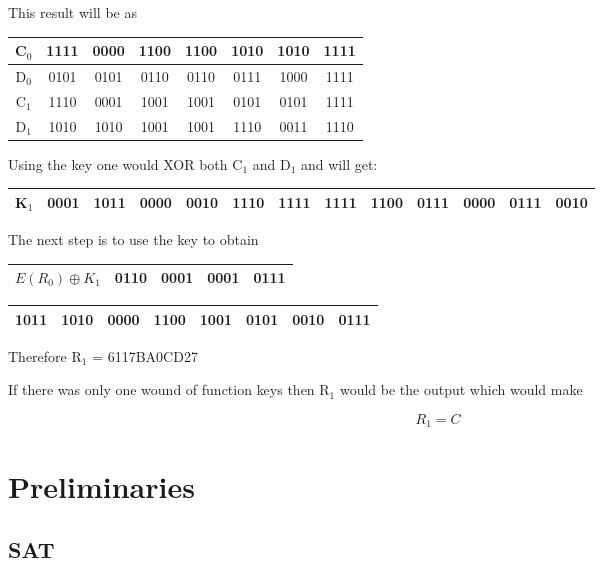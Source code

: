 \documentclass[11pt,a4paper]{report}
\begin{document}
This result will be as

\begin{center}
\begin{tabular}{|c|c|c|c|c|c|c|c|} \hline
C$_{0}$ & 1111 & 0000 & 1100 & 1100 & 1010 & 1010 & 1111\\ \hline
D$_{0}$ & 0101 & 0101 & 0110 & 0110 & 0111 & 1000 & 1111\\ \hline
C$_{1}$ & 1110 & 0001 & 1001 & 1001 & 0101 & 0101 & 1111\\ \hline
D$_{1}$ & 1010 & 1010 & 1001 & 1001 & 1110 & 0011 & 1110\\ \hline
\end{tabular}
\end{center}

Using the key one would XOR both C$_{1}$ and D$_{1}$ and will get:

\begin{center}
\begin{tabular}{|c|c|c|c|c|c|c|c|c|c|c|c|c|}\hline
K$_{1}$ & 0001 & 1011 & 0000 & 0010 & 1110 & 1111 & 1111 & 1100 & 0111 & 0000 & 0111 & 0010\\ \hline
\end{tabular}
\end{center}

The next step is to use the key to obtain

\begin{tabular}{|c|c|c|c|c|}\hline
$E(R_{0}) \oplus K_{1}$ & 0110 & 0001 & 0001 & 0111\\ \hline
\end{tabular}

\indent \begin{tabular}{|c|c||c|c|c|c|c|c|}\hline
1011 & 1010 & 0000 & 1100 & 1001 & 0101 & 0010 & 0111\\ \hline
\end{tabular}

Therefore R$_{1}$ = 6117BA0CD27

If there was only one wound of function keys then R$_{1}$ would be the output which would make

\begin{displaymath}
R_{1} = C
\end{displaymath}

\chapter{Preliminaries}
\label{cha:prelim}

\section{SAT}
\label{sec:SAT}
\end{document}
